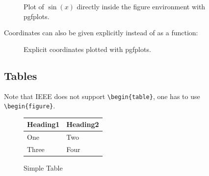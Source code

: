 \begin{ltgexample}
\begin{figure}[ht]
  \centering
  \caption{Plot of $\sin(x)$ directly inside the figure environment with pgfplots.}
  \label{fig:pgfplots_example}
\end{figure}
\end{ltgexample}

Coordinates can also be given explicitly instead of as a function:
\begin{ltgexample}
\begin{figure}[ht]
  \centering
  \caption{Explicit coordinates plotted with pgfplots.}
  \label{fig:pgfplots_coords}
\end{figure}
\end{ltgexample}

\subsection{Tables}

Note that IEEE does not support \verb+\begin{table}+, one has to use \verb+\begin{figure}+.

\begin{ltgexample}
\begin{figure}
  \caption{Simple Table}
  \label{tab:simple}
  \centering
  \begin{tabular}{ll}
    \toprule
    Heading1 & Heading2 \\
    \midrule
    One      & Two      \\
    Three    & Four     \\
    \bottomrule
  \end{tabular}
\end{figure}
\end{ltgexample}

